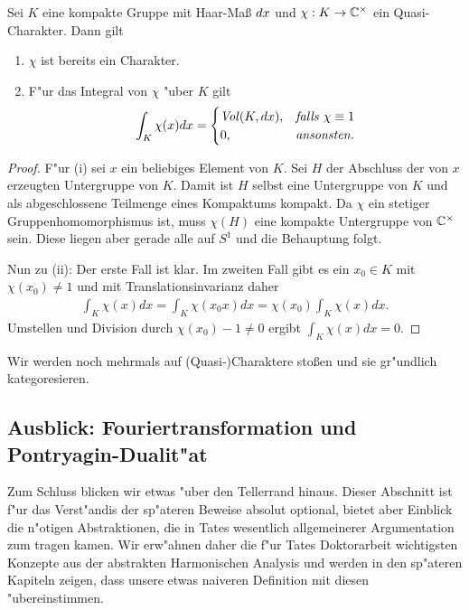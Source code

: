 	\begin{lemma}\label{Lemma:trivialerCharAufKompakt}
		Sei $K$ eine kompakte Gruppe mit Haar-Maß $d{x}$ und $\chi: K \to \mathbb{C}^\times$ ein Quasi-Charakter. Dann gilt
		\begin{enumerate}[label=\emph{(\roman*)}]
				\item $\chi$ ist bereits ein Charakter.
				\item F"ur das Integral von $\chi$ "uber $K$ gilt
					\begin{align*}
						\int_K \chi(x) dx = 
							\begin{cases}
								\text{\emph{Vol}}(K, dx),	& \text{\emph{falls} } \chi\equiv 1\\
								0,					& \text{\emph{ansonsten.}}
							\end{cases}
					\end{align*}
		\end{enumerate}
	\end{lemma}
	\begin{proof}
		F"ur (i) sei $x$ ein beliebiges Element von $K$. 
		Sei $H$ der Abschluss der von $x$ erzeugten Untergruppe von $K$.
		Damit ist $H$ selbst eine Untergruppe von $K$ und als abgeschlossene Teilmenge eines Kompaktums kompakt.
		Da $\chi$ ein stetiger Gruppenhomomorphismus ist, muss $\chi(H)$ eine kompakte Untergruppe von $\mathbb{C}^\times$ sein.
		Diese liegen aber gerade alle auf $S^1$ und die Behauptung folgt.
		
		Nun zu (ii): Der erste Fall ist klar. 
		Im zweiten Fall gibt es ein $x_0 \in K$ mit $\chi(x_0) \not=1$ und mit Translationsinvarianz daher
		\begin{align*}
			\int_K \chi(x)dx = \int_K\chi(x_0x)dx = \chi(x_0)\int_K\chi(x)dx.
		\end{align*}
		Umstellen und Division durch $\chi(x_0) - 1 \not=0$ ergibt $\int_K \chi(x)dx = 0$.
	\end{proof}
	Wir werden noch mehrmals auf (Quasi-)Charaktere stoßen und sie gr"undlich kategoresieren.
	
\subsection{Ausblick: Fouriertransformation und Pontryagin-Dualit"at}
	Zum Schluss blicken wir etwas "uber den Tellerrand hinaus.
	Dieser Abschnitt ist f"ur das Verst"andis der sp"ateren Beweise absolut optional, bietet aber Einblick die n"otigen Abstraktionen, die in Tates wesentlich allgemeinerer Argumentation zum tragen kamen.
	Wir erw"ahnen daher die f"ur Tates Doktorarbeit wichtigsten Konzepte aus der abstrakten Harmonischen Analysis und werden in den sp"ateren Kapiteln zeigen, dass unsere etwas naiveren Definition mit diesen "ubereinstimmen.
	
